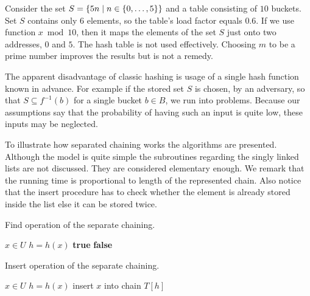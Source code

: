 \begin{example}
Consider the set $S = \{5n \mid n \in \{0, \dots, 5\} \}$ and a table consisting of $10$ buckets. Set $S$ contains only 6 elements, so the table's load factor equals $0.6$. If we use function $x \bmod 10$, then it maps the elements of the set $S$ just onto two addresses, $0$ and $5$. The hash table is not used effectively. Choosing $m$ to be a prime number improves the results but is not a remedy.
\end{example}

The apparent disadvantage of classic hashing is usage of a single hash function known in advance. For example if  the stored set $S$ is chosen, by an adversary, so that $S \subseteq f^{-1}(b)$ for a single bucket $b \in B$, we run into problems. Because our assumptions say that the probability of having such an input is quite low, these inputs may be neglected.

To illustrate how separated chaining works the algorithms are presented. Although the model is quite simple the subroutines regarding the singly linked lists are not discussed. They are considered elementary enough. We remark that the running time is proportional to length of the represented chain. Also notice that the insert procedure has to check whether the element is already stored inside the list else it can be stored twice. 

\begin{algorithm}[H]
\caption{Find operation of the separate chaining.}
\label{algorithm-find-separate-chaining}
\begin{algorithmic}
\REQUIRE $x \in U$
\STATE $h = h(x)$
\STATE
{}
	\RETURN \textbf{true} 
\ELSE
	\RETURN \textbf{false} 
\ENDIF
\end{algorithmic}
\end{algorithm}

\begin{algorithm}[H]
\caption{Insert operation of the separate chaining.}
\label{algorithm-insert-separate-chaining}
\begin{algorithmic}
\REQUIRE $x \in U$
\STATE $h = h(x)$
\STATE
{}
	\STATE insert $x$ into chain $T[h]$
\ENDIF
\end{algorithmic}
\end{algorithm}

